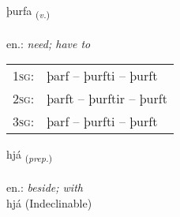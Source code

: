 \documentclass[frontgrid, backgrid]{flacards}\usepackage[]{graphicx}\usepackage[]{xcolor}
\begin{document}
\renewcommand{\blhead}{\vskip5pt {\small\bfseries\footnotesize Sagnorð | Verb }}
\renewcommand{\bcfoot}{\vskip5pt \hspace{2pt}{\small\bfseries\footnotesize 1K}}


{þurfa \small{\textsubscript{(\textit{v.})}} \\[1ex] %
\textphonetic{[θʏrva]} \\
en.: \emph{need; have to} \\  [2ex]
\renewcommand*{\arraystretch}{0.8}
\begin{tabular}{p{1cm}l}
\textsc{1sg}: & þarf -- þurfti -- þurft \\ 
\textsc{2sg}: & þarft -- þurftir -- þurft \\ 
\textsc{3sg}: & þarf -- þurfti -- þurft \\ 
\end{tabular}
}


\renewcommand{\flhead}{\vskip5pt \fboxsep=0pt {\small\bfseries\footnotesize Forsetning | Preposition}}
\renewcommand{\fcfoot}{\vskip5pt \fboxsep=0pt \hspace{2pt}{\small\bfseries\footnotesize 1K}}

\renewcommand{\blhead}{\vskip5pt {\small\bfseries\footnotesize Forsetning | Preposition }}
\renewcommand{\bcfoot}{\vskip5pt \hspace{2pt}{\small\bfseries\footnotesize 1K}}


{hjá \small{\textsubscript{(\textit{prep.})}} \\[1ex]
\textphonetic{[çauː]} \\
en.: \emph{beside; with} \\  [2ex]
hjá (Indeclinable)}

\renewcommand{\flhead}{\vskip5pt \fboxsep=0pt {\small\bfseries\footnotesize Nafnorð | Noun}}
\renewcommand{\fcfoot}{\vskip5pt \fboxsep=0pt \hspace{2pt}{\small\bfseries\footnotesize 1K}}

\renewcommand{\blhead}{\vskip5pt {\small\bfseries\footnotesize Nafnorð | Noun }}
\renewcommand{\bcfoot}{\vskip5pt \hspace{2pt}{\small\bfseries\footnotesize 1K}}
\end{document}
